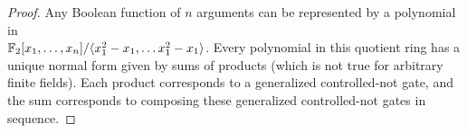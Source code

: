 \begin{lemma}


%
%


\end{lemma}


\begin{proof}
Any  Boolean function of $n$ arguments can be represented by a polynomial in\\
 $\mathbb{F}_2[x_1,\ldots, x_n]/\langle x_1^2-x_1,\ldots x_1^2-x_1\rangle$.  Every polynomial in this quotient ring has a unique normal form given by sums of products (which is not true for arbitrary finite fields).  Each product corresponds to a generalized controlled-not gate, and the sum corresponds to composing these generalized controlled-not gates in sequence.
\end{proof}

